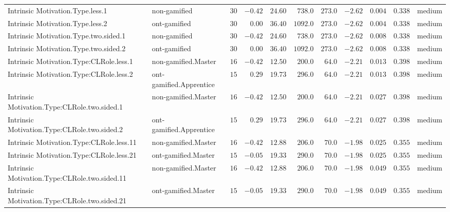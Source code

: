 \documentclass[6pt,a4paper]{article}
\begin{document}
\begin{landscape}
{\begin{longtable}{llrrrrrrrrl}
Intrinsic Motivation.Type.less.1&non-gamified&$30$&$-0.42$&$24.60$&$ 738.0$&$273.0$&$-2.62$&$0.004$&$0.338$&medium\tabularnewline
Intrinsic Motivation.Type.less.2&ont-gamified&$30$&$ 0.00$&$36.40$&$1092.0$&$273.0$&$-2.62$&$0.004$&$0.338$&medium\tabularnewline
Intrinsic Motivation.Type.two.sided.1&non-gamified&$30$&$-0.42$&$24.60$&$ 738.0$&$273.0$&$-2.62$&$0.008$&$0.338$&medium\tabularnewline
Intrinsic Motivation.Type.two.sided.2&ont-gamified&$30$&$ 0.00$&$36.40$&$1092.0$&$273.0$&$-2.62$&$0.008$&$0.338$&medium\tabularnewline
Intrinsic Motivation.Type:CLRole.less.1&non-gamified.Master&$16$&$-0.42$&$12.50$&$ 200.0$&$ 64.0$&$-2.21$&$0.013$&$0.398$&medium\tabularnewline
Intrinsic Motivation.Type:CLRole.less.2&ont-gamified.Apprentice&$15$&$ 0.29$&$19.73$&$ 296.0$&$ 64.0$&$-2.21$&$0.013$&$0.398$&medium\tabularnewline
Intrinsic Motivation.Type:CLRole.two.sided.1&non-gamified.Master&$16$&$-0.42$&$12.50$&$ 200.0$&$ 64.0$&$-2.21$&$0.027$&$0.398$&medium\tabularnewline
Intrinsic Motivation.Type:CLRole.two.sided.2&ont-gamified.Apprentice&$15$&$ 0.29$&$19.73$&$ 296.0$&$ 64.0$&$-2.21$&$0.027$&$0.398$&medium\tabularnewline
Intrinsic Motivation.Type:CLRole.less.11&non-gamified.Master&$16$&$-0.42$&$12.88$&$ 206.0$&$ 70.0$&$-1.98$&$0.025$&$0.355$&medium\tabularnewline
Intrinsic Motivation.Type:CLRole.less.21&ont-gamified.Master&$15$&$-0.05$&$19.33$&$ 290.0$&$ 70.0$&$-1.98$&$0.025$&$0.355$&medium\tabularnewline
\newpage
Intrinsic Motivation.Type:CLRole.two.sided.11&non-gamified.Master&$16$&$-0.42$&$12.88$&$ 206.0$&$ 70.0$&$-1.98$&$0.049$&$0.355$&medium\tabularnewline
Intrinsic Motivation.Type:CLRole.two.sided.21&ont-gamified.Master&$15$&$-0.05$&$19.33$&$ 290.0$&$ 70.0$&$-1.98$&$0.049$&$0.355$&medium\tabularnewline
\hline
\end{longtable}}

\end{landscape}
\end{document}
